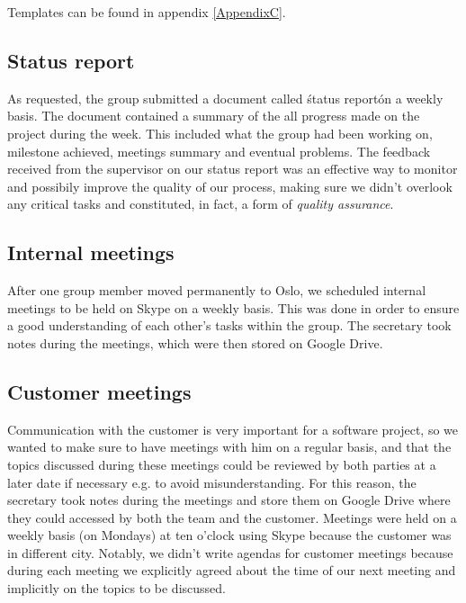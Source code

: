 Templates can be found in appendix \ref{AppendixC}.

\subsection{Status report}
As requested, the group submitted a document called \'status report\' on a weekly basis.
The document contained a summary of the all progress made on the project during the week.
This included what the group had been working on, milestone achieved, meetings summary and eventual problems.
The feedback received from the supervisor on our status report was an effective way to monitor and possibily improve
the quality of our process, making sure we didn't overlook any critical tasks and constituted, in fact, a form of
\textit{quality assurance}.

\subsection{Internal meetings}
After one group member moved permanently to Oslo, we scheduled internal meetings to be held on Skype
on a weekly basis. This was done in order to ensure a good understanding of each other's tasks within the group.
The secretary took notes during the meetings, which were then stored on Google Drive.

\subsection{Customer meetings}
Communication with the customer is very important for a software project, so we wanted to make sure to have meetings
with him on a regular basis, and that the topics discussed during these meetings could be reviewed by
both parties at a later date if necessary e.g. to avoid misunderstanding.
For this reason, the secretary took notes during the meetings and store them on Google Drive where they
could accessed by both the team and the customer. Meetings were held on a weekly basis (on Mondays) at ten o'clock using
Skype because the customer was in different city.
Notably, we didn't write agendas for customer meetings because during each meeting we explicitly
agreed about the time of our next meeting and implicitly on the topics to be discussed.


